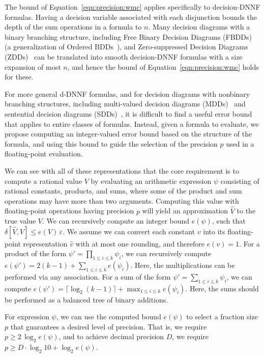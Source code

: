 \documentclass[
hf
]{ceurart}
\newcommand{\approximate}[1]{\hat{#1}}
\newcommand{\approxv}{\approximate{v}}
\newcommand{\approxV}{\approximate{V}}
\newcommand{\aerror}{\delta}
\newcommand{\roundepsilon}{\varepsilon}
\begin{document}
The bound of Equation~\ref{eqn:precision:wmc} applies specifically to decision-DNNF
formulas.  Having a decision variable associated with each disjunction
bounds the depth of the sum operations in a formula to $n$.  Many
decision diagrams with a binary branching structure, including Free
Binary Decision Diagrams (FBDDs)~\cite{wegener:siam:2000}
(a generalization of Ordered BDDs~\cite{bryant:ieeetc:1986,knuth:bdd:2011}), and Zero-suppressed Decision
Diagrams (ZDDs)~\cite{minato:sttt:2001,minato:ijcai:2007} can be
translated into smooth decision-DNNF formulas with a size expansion of
most $n$, and hence the bound of Equation~\ref{eqn:precision:wmc}
holds for these.

For more general d-DNNF formulas, and for decision diagrams with
nonbinary branching structures, including multi-valued decision
diagrams (MDDs)~\cite{srinivasan:iccad:1990} and sentential decision
diagrams (SDDs)~\cite{darwiche:ijcai:2011}, it is difficult to find a
useful error bound that applies to entire classes of formulas.
Instead, given a formula to evaluate,
we propose computing an integer-valued error bound based on the
structure of the formula, and using this bound to guide the selection of
the precision $p$ used in a floating-point evaluation.

We can see with all of these representations that the core requirement
is to compute a rational value $V$ by evaluating an arithmetic
expression $\psi$ consisting of rational constants, products, and
sums, where some of the product and sum operations may have more than
two arguments.  Computing this value with floating-point operations
having precision $p$ will yield an approximation $\approxV$ to the
true value $V$.  We can recursively compute an integer bound $e(\psi)$, such that
$\aerror[\approxV, V] \leq e(V) \,\roundepsilon$.  We assume we
can convert each constant $v$ into its floating-point representation
$\approxv$ with at most one rounding, and therefore $e(v) = 1$.  For a
product of the form $\psi' = \prod_{1 \leq i \leq k} \psi_i$, we can
recursively compute $e(\psi') = 2(k-1) + \sum_{1 \leq i \leq k}
e(\psi_i)$.  Here, the multiplications can be performed via any
association.
For a sum of the form
$\psi' = \sum_{1 \leq i \leq k} \psi_i$, we can compute
$e(\psi') = \lceil \log_2(k-1)\rceil + \max_{1\leq i \leq k} e(\psi_i)$.  Here, the sums should be performed as a balanced tree of binary additions.

For expression $\psi$, we can use the computed bound $e(\psi)$ to
select a fraction size $p$ that guarantees a desired level of
precision.  That is, we require $p \geq 2\,\log_2 e(\psi)$, and to
achieve decimal precision $D$, we require $p \geq D \cdot \log_2 10 +\log_2 e(\psi)$.
\end{document}
